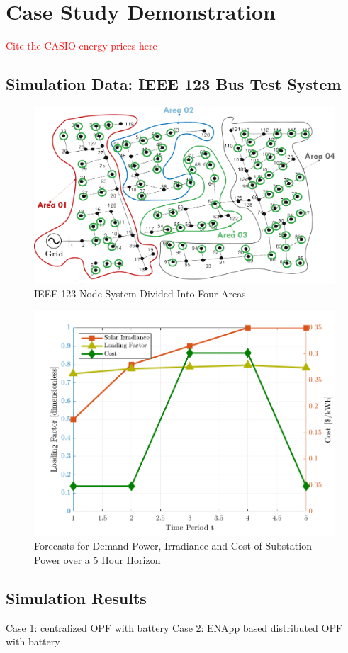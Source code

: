 \documentclass[../../outputs/main.tex]{subfiles}
\begin{document}
\section{Case Study Demonstration}

\textcolor{red}{Cite the CASIO energy prices here}
\subsection{Simulation Data: IEEE 123 Bus Test System}

\begin{figure}[h!]
    \centering
    \includegraphics[width=\linewidth]{../figures/ieee123-FourAreas.png}
    \caption{IEEE 123 Node System Divided Into Four Areas}
    \label{fig:ieee123-four-area-figure}
\end{figure}


\begin{figure}[h!]
    \centering
    \includegraphics[height=0.25\textheight]{../figures/T5-inputCurves/InputCurves_Horizon_5.png}
    \caption{Forecasts for Demand Power, Irradiance and Cost of Substation Power over a 5 Hour Horizon}
    \label{fig:inputCurve-5}
\end{figure}


\subsection{Simulation Results}
Case 1: centralized OPF with battery
Case 2: ENApp based distributed OPF with battery
\end{document}
